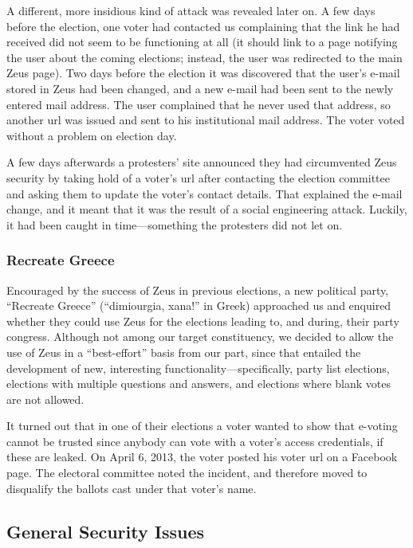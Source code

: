 \documentclass[jets]{usenixjournal}
\begin{document}
A different, more insidious kind of attack was revealed later on. A
few days before the election, one voter had contacted us complaining
that the link he had received did not seem to be functioning at all
(it should link to a page notifying the user about the coming
elections; instead, the user was redirected to the main Zeus page).
Two days before the election it was discovered that the user's e-mail
stored in Zeus had been changed, and a new e-mail had been sent to the
newly entered mail address. The user complained that he never used
that address, so another {\sc url} was issued and sent to his institutional
mail address. The voter voted without a problem on election day.

A few days afterwards a protesters' site announced they had
circumvented Zeus security by taking hold of a voter's {\sc url} after
contacting the election committee and asking them to update the
voter's contact details. That explained the e-mail change, and it
meant that it was the result of a social engineering attack. Luckily,
it had been caught in time---something the protesters did not let on.


\subsubsection{Recreate Greece}

Encouraged by the success of Zeus in previous elections, a new
political party, ``Recreate Greece'' (``dimiourgia, xana!'' in Greek)
approached us and enquired whether they could use Zeus for the
elections leading to, and during, their party congress. Although not
among our target constituency, we decided to allow the use of Zeus in
a ``best-effort'' basis from our part, since that entailed the
development of new, interesting functionality---specifically, party
list elections, elections with multiple questions and answers, and
elections where blank votes are not allowed.

It turned out that in one of their elections a voter wanted to show
that e-voting cannot be trusted since anybody can vote with a voter's
access credentials, if these are leaked. On April 6, 2013, the voter
posted his voter {\sc url} on a Facebook page. The electoral committee noted
the incident, and therefore moved to disqualify the ballots cast under
that voter's name. 

\subsection{General Security Issues}
\label{ssec:security-discussion}
\end{document}

